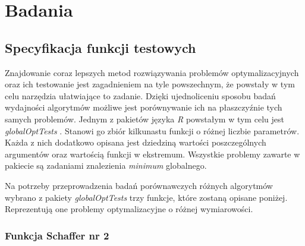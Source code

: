 \newpage
\chapter{Badania}


\section{Specyfikacja funkcji testowych}
Znajdowanie coraz lepszych metod rozwiązywania problemów optymalizacyjnych oraz ich testowanie jest zagadnieniem na tyle powszechnym, że powstały w tym celu narzędzia ułatwiające to zadanie. Dzięki ujednoliceniu sposobu badań wydajności algorytmów możliwe jest porównywanie ich na płaszczyźnie tych samych problemów. Jednym z pakietów języka \emph{R} powstałym w tym celu jest \emph{globalOptTests} \cite{globalOptTestsPackage}. Stanowi go zbiór kilkunastu funkcji o różnej liczbie parametrów. Każda z nich dodatkowo opisana jest dziedziną wartości poszczególnych argumentów oraz wartością funkcji w ekstremum. Wszystkie problemy zawarte w pakiecie są zadaniami znalezienia \emph{minimum} globalnego.
\par
Na potrzeby przeprowadzenia badań porównawczych różnych algorytmów wybrano z pakiety \emph{globalOptTests} trzy funkcje, które zostaną opisane poniżej. Reprezentują one problemy  optymalizacyjne o różnej wymiarowości. 
\subsection{Funkcja Schaffer nr 2}

